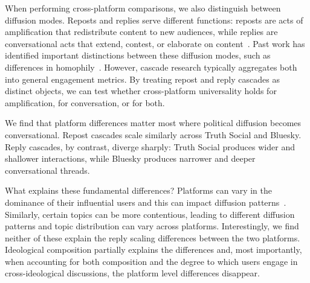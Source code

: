 \documentclass[letterpaper]{article} %
\begin{document}
When performing cross-platform comparisons, we also distinguish between diffusion modes. Reposts and replies serve different functions: reposts are acts of amplification that redistribute content to new audiences, while replies are conversational acts that extend, contest, or elaborate on content~\citep{conover_political_2011,boyd_tweet_2010,guerrero_sole_interactive_2018}. Past work has identified important distinctions between these diffusion modes, such as differences in homophily~\citep{conover_political_2011}. However, cascade research typically aggregates both into general engagement metrics. By treating repost and reply cascades as distinct objects, we can test whether cross-platform universality holds for amplification, for conversation, or for both.



We find that platform differences matter most where political diffusion becomes conversational. Repost cascades scale similarly across Truth Social and Bluesky. %
Reply cascades, by contrast, diverge sharply: Truth Social produces wider and shallower interactions, while Bluesky produces narrower and deeper conversational threads. 

What explains these fundamental differences? Platforms can vary in the dominance of their influential users and this can impact diffusion patterns~\citep{goel_structural_2016, zannettou_what_2018}. 
Similarly, certain topics can be more contentious, leading to different diffusion patterns \cite{vosoughi_spread_2018, wang_factors_2022} and topic distribution can vary across platforms. Interestingly, we find neither of these explain the reply scaling differences between the two platforms. Ideological composition partially explains the differences and, most importantly, when accounting for both composition and the degree to which users engage in cross-ideological discussions, the platform level differences disappear. 
\end{document}
